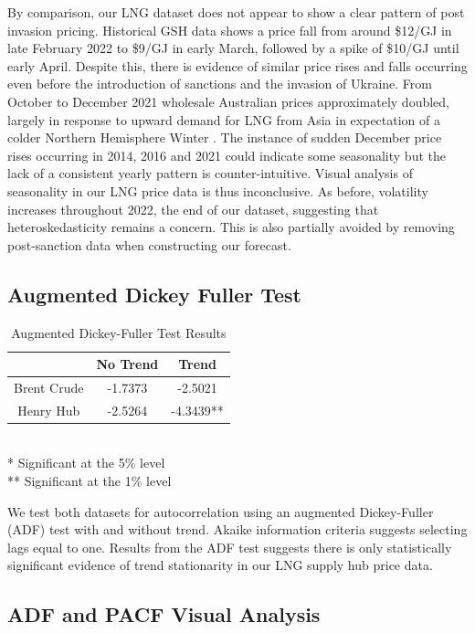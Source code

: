 By comparison, our LNG dataset does not appear to show a clear pattern of post invasion pricing. Historical GSH data shows a price fall from around \$12/GJ in late February 2022 to \$9/GJ in early March, followed by a spike of \$10/GJ until early April. Despite this, there is evidence of similar price rises and falls occurring even before the introduction of sanctions and the invasion of Ukraine. From October to December 2021 wholesale Australian prices approximately doubled, largely in response to upward demand for LNG from Asia in expectation of a colder Northern Hemisphere Winter \cite{mitch7}. The instance of sudden December price rises occurring in 2014, 2016 and 2021 could indicate some seasonality but the lack of a consistent yearly pattern is counter-intuitive. Visual analysis of seasonality in our LNG price data is thus inconclusive. As before, volatility increases throughout 2022, the end of our dataset, suggesting that heteroskedasticity remains a concern. This is also partially avoided by removing post-sanction data when constructing our forecast.

\subsection{Augmented Dickey Fuller Test}

\begin{table}[H]
\centering
\caption{Augmented Dickey-Fuller Test Results}
\begin{tabular}{c|cc}
            & No Trend & Trend\\\hline\hline
Brent Crude & -1.7373 & -2.5021\\\hline
Henry Hub & -2.5264 & -4.3439**
\end{tabular}\label{Tab:ADF_LNG}
\\
* Significant at the 5\% level\\
** Significant at the 1\% level
\end{table}

We test both datasets for autocorrelation using an augmented Dickey-Fuller (ADF) test with and without trend. Akaike information criteria suggests selecting lags equal to one. Results from the ADF test suggests there is only statistically significant evidence of trend stationarity in our LNG supply hub price data.

\subsection{ADF and PACF Visual Analysis}

